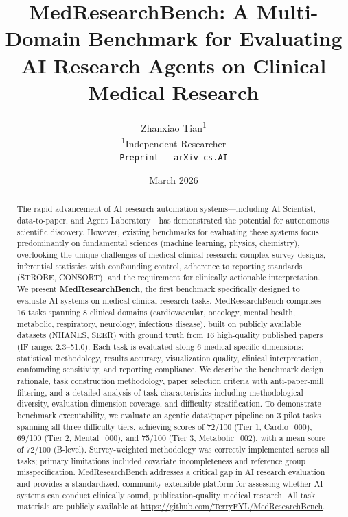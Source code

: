 \documentclass[12pt]{article}
\title{\textbf{MedResearchBench}: A Multi-Domain Benchmark for Evaluating\\
AI Research Agents on Clinical Medical Research}
\author{
  Zhanxiao Tian\textsuperscript{1}\\[6pt]
  \textsuperscript{1}Independent Researcher\\[4pt]
  \small\texttt{Preprint — arXiv cs.AI}
}
\date{March 2026}
\begin{document}
\maketitle

\begin{abstract}
The rapid advancement of AI research automation systems---including AI Scientist, data-to-paper, and Agent Laboratory---has demonstrated the potential for autonomous scientific discovery. However, existing benchmarks for evaluating these systems focus predominantly on fundamental sciences (machine learning, physics, chemistry), overlooking the unique challenges of medical clinical research: complex survey designs, inferential statistics with confounding control, adherence to reporting standards (STROBE, CONSORT), and the requirement for clinically actionable interpretation. We present \textbf{MedResearchBench}, the first benchmark specifically designed to evaluate AI systems on medical clinical research tasks. MedResearchBench comprises 16 tasks spanning 8 clinical domains (cardiovascular, oncology, mental health, metabolic, respiratory, neurology, infectious disease), built on publicly available datasets (NHANES, SEER) with ground truth from 16 high-quality published papers (IF range: 2.3--51.0). Each task is evaluated along 6 medical-specific dimensions: statistical methodology, results accuracy, visualization quality, clinical interpretation, confounding sensitivity, and reporting compliance. We describe the benchmark design rationale, task construction methodology, paper selection criteria with anti-paper-mill filtering, and a detailed analysis of task characteristics including methodological diversity, evaluation dimension coverage, and difficulty stratification. To demonstrate benchmark executability, we evaluate an agentic data2paper pipeline on 3 pilot tasks spanning all three difficulty tiers, achieving scores of 72/100 (Tier 1, Cardio\_000), 69/100 (Tier 2, Mental\_000), and 75/100 (Tier 3, Metabolic\_002), with a mean score of 72/100 (B-level). Survey-weighted methodology was correctly implemented across all tasks; primary limitations included covariate incompleteness and reference group misspecification. MedResearchBench addresses a critical gap in AI research evaluation and provides a standardized, community-extensible platform for assessing whether AI systems can conduct clinically sound, publication-quality medical research. All task materials are publicly available at \url{https://github.com/TerryFYL/MedResearchBench}.
\end{abstract}
\end{document}
